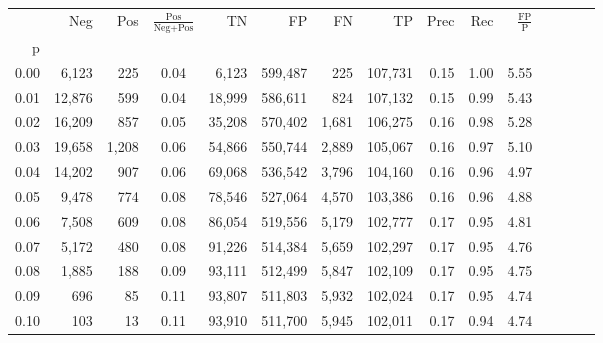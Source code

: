 \begin{tabular}{rrrcrrrrrrrrrrr}
\toprule
{} &     Neg &    Pos & $\frac{\text{Pos}}{\text{Neg}+\text{Pos}}$ &       TN &       FP &       FN &       TP &  Prec &   Rec & $\frac{\text{FP}}{\text{P}}$ \\
p    &         &        &                                            &          &          &          &          &       &       &                              \\
\midrule
0.00 &   6,123 &    225 &                                       0.04 &    6,123 &  599,487 &      225 &  107,731 &  0.15 &  1.00 &                         5.55 \\
0.01 &  12,876 &    599 &                                       0.04 &   18,999 &  586,611 &      824 &  107,132 &  0.15 &  0.99 &                         5.43 \\
0.02 &  16,209 &    857 &                                       0.05 &   35,208 &  570,402 &    1,681 &  106,275 &  0.16 &  0.98 &                         5.28 \\
0.03 &  19,658 &  1,208 &                                       0.06 &   54,866 &  550,744 &    2,889 &  105,067 &  0.16 &  0.97 &                         5.10 \\
0.04 &  14,202 &    907 &                                       0.06 &   69,068 &  536,542 &    3,796 &  104,160 &  0.16 &  0.96 &                         4.97 \\
0.05 &   9,478 &    774 &                                       0.08 &   78,546 &  527,064 &    4,570 &  103,386 &  0.16 &  0.96 &                         4.88 \\
0.06 &   7,508 &    609 &                                       0.08 &   86,054 &  519,556 &    5,179 &  102,777 &  0.17 &  0.95 &                         4.81 \\
0.07 &   5,172 &    480 &                                       0.08 &   91,226 &  514,384 &    5,659 &  102,297 &  0.17 &  0.95 &                         4.76 \\
0.08 &   1,885 &    188 &                                       0.09 &   93,111 &  512,499 &    5,847 &  102,109 &  0.17 &  0.95 &                         4.75 \\
0.09 &     696 &     85 &                                       0.11 &   93,807 &  511,803 &    5,932 &  102,024 &  0.17 &  0.95 &                         4.74 \\
0.10 &     103 &     13 &                                       0.11 &   93,910 &  511,700 &    5,945 &  102,011 &  0.17 &  0.94 &                         4.74 \\

\end{tabular}
